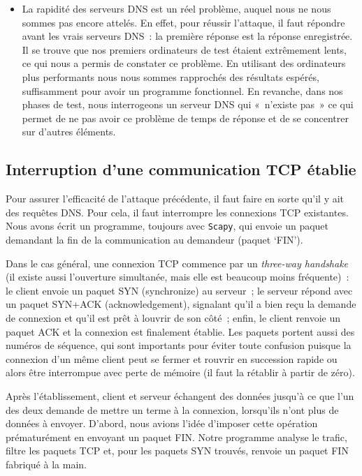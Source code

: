 \documentclass[a4paper, 12pt,twoside]{article}
\begin{document}
\begin{itemize}[label=\color{bleu303}\textbullet{}]
        \item La rapidité des serveurs DNS est un réel problème, auquel nous ne nous sommes pas encore attelés. En effet, pour réussir l'attaque, il faut répondre avant les vrais serveurs DNS~: la première réponse est la réponse enregistrée. Il se trouve que nos premiers ordinateurs de test étaient extrêmement lents, ce qui nous a permis de constater ce problème. En utilisant des ordinateurs plus performants nous nous sommes rapprochés des résultats espérés, suffisamment pour avoir un programme fonctionnel. En revanche, dans nos phases de test, nous interrogeons un serveur DNS qui «~n'existe pas~» ce qui permet de ne pas avoir ce problème de temps de réponse et de se concentrer sur d'autres éléments.
    \end{itemize}

    \subsection{Interruption d'une communication TCP établie}\label{tcpstop}

        Pour assurer l'efficacité de l'attaque précédente, il faut faire en sorte qu'il y ait des requêtes DNS. Pour cela, il faut interrompre les connexions TCP existantes. Nous avons écrit un programme, toujours avec \verb!Scapy!, qui envoie un paquet demandant la fin de la communication au demandeur (paquet ‘FIN').

        Dans le cas général, une connexion TCP commence par un \emph{three-way handshake} (il existe aussi l'ouverture simultanée, mais elle est beaucoup moins fréquente)~: le client envoie un paquet SYN (synchronize) au serveur~; le serveur répond avec un paquet SYN+ACK (acknowledgement), signalant qu'il a bien reçu la demande de connexion et qu'il est prêt à louvrir de son côté~; enfin, le client renvoie un paquet ACK et la connexion est finalement établie. Les paquets portent aussi des numéros de séquence, qui sont importants pour éviter toute confusion puisque la connexion d'un même client peut se fermer et rouvrir en succession rapide ou alors être interrompue avec perte de mémoire (il faut la rétablir à partir de zéro).

        Après l'établissement, client et serveur échangent des données jusqu'à ce que l'un des deux demande de mettre un terme à la connexion, lorsqu'ils n'ont plus de données à envoyer. D'abord, nous avions l'idée d'imposer cette opération prématurément en envoyant un paquet FIN. Notre programme analyse le trafic, filtre les paquets TCP et, pour les paquets SYN trouvés, renvoie un paquet FIN fabriqué à la main.
\end{document}
